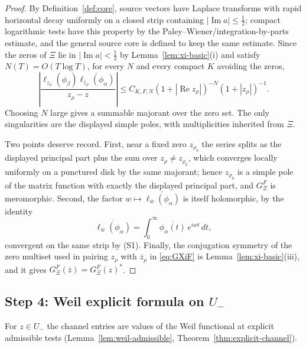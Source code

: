 \documentclass[11pt]{amsart}
\theoremstyle{definition}
\theoremstyle{remark}
\theoremstyle{definition}
\renewcommand{\Re}{\operatorname{Re}}
\renewcommand{\Im}{\operatorname{Im}}
\newcommand{\half}{\tfrac{1}{2}}
\newcommand{\GXi}{G_\Xi}
\begin{document}
\begin{proof}
By Definition~\ref{def:core}, source vectors have Laplace transforms with rapid horizontal decay uniformly
on a closed strip containing $|\Im a|\le\half$; compact logarithmic tests have this property by the
Paley--Wiener/integration-by-parts estimate, and the general source core is defined to keep the same
estimate.  Since the zeros of $\Xi$ lie in $|\Im a|<\half$ by Lemma~\ref{lem:xi-basic}(i) and satisfy
$N(T)=O(T\log T)$, for every $N$ and every compact $K$ avoiding the zeros,
\[
   \left|
   \frac{
      \ell_{z_\rho}(\phi_\beta)\overline{\ell_{\bar z_\rho}(\phi_\alpha)}
   }{z_\rho-z}
   \right|
   \le
   C_{K,F,N}(1+|\Re z_\rho|)^{-N}(1+|z_\rho|)^{-1}.
\]
Choosing $N$ large gives a summable majorant over the zero set.  The only singularities are the displayed
simple poles, with multiplicities inherited from $\Xi$.

Two points deserve record.  First, near a fixed zero $z_{\rho_0}$ the series splits as the displayed
principal part plus the sum over $z_\rho\ne z_{\rho_0}$, which converges locally uniformly on a
punctured disk by the same majorant; hence $z_{\rho_0}$ is a simple pole of the matrix function with
exactly the displayed principal part, and $\GXi^F$ is meromorphic.  Second, the factor
$w\mapsto\overline{\ell_{\bar w}(\phi_\alpha)}$ is itself holomorphic, by the identity
\[
   \overline{\ell_{\bar w}(\phi_\alpha)}
   =\int_0^\infty\overline{\phi_\alpha(t)}\,e^{iwt}\,dt ,
\]
convergent on the same strip by \textnormal{(S1)}.  Finally, the conjugation symmetry of the zero
multiset used in pairing $z_\rho$ with $\bar z_\rho$ in \eqref{eq:GXiF} is
Lemma~\ref{lem:xi-basic}(iii), and it gives $\GXi^F(\bar z)=\GXi^F(z)^*$.
\end{proof}

\subsection{Step 4: Weil explicit formula on \texorpdfstring{$U_-$}{U-}}

For $z\in U_-$ the channel entries are values of the Weil functional at explicit admissible tests
(Lemma~\ref{lem:weil-admissible}, Theorem~\ref{thm:explicit-channel}).
\end{document}
